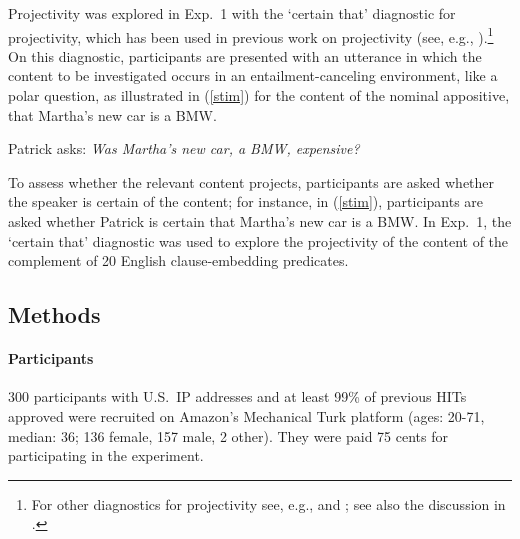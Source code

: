 \documentclass[11pt,fleqn]{article}
\newcommand{\6}{\mbox{$[\hspace*{-.6mm}[$}}
\newcommand{\9}{\mbox{$]\hspace*{-.6mm}]$}}
\begin{document}
Projectivity was explored in Exp.~1 with the `certain that' diagnostic for projectivity, which has been used in previous work on projectivity (see, e.g., \citealt{tonhauser-salt26,djaerv-bacovcin-salt27,stevens-etal2017,tbd-variability}).\footnote{For other diagnostics for projectivity see, e.g., \citealt{smith-hall11,xue-onea11} and \citealt{brst-lang11}; see also the discussion in \citealt{tbd-variability}.} On this diagnostic, participants are presented with an utterance in which the content to be investigated occurs in an entailment-canceling environment, like a polar question, as illustrated in (\ref{stim}) for the content of the nominal appositive, that Martha's new car is a BMW.

\begin{exe}

\ex\label{stim} Patrick asks: {\em Was Martha's new car, a BMW, expensive?} 

\end{exe}
To assess whether the relevant content projects, participants are asked whether the speaker is certain of the content; for instance, in (\ref{stim}), participants are asked whether Patrick is certain that Martha's new car is a BMW. In Exp.~1, the `certain that' diagnostic was used to explore the projectivity of the content of the complement of 20 English clause-embedding predicates. 
 

\subsection{Methods}

\paragraph{Participants} 300 participants with U.S.\ IP addresses and at least 99\% of previous HITs approved were recruited on Amazon's Mechanical Turk platform (ages: 20-71, median: 36; 136 female, 157 male, 2 other). They were paid 75 cents for participating in the experiment.
\end{document}
